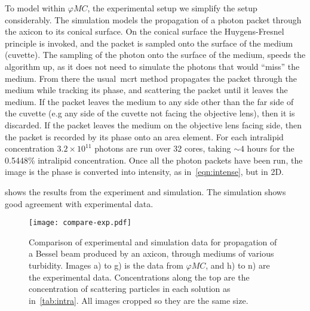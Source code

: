 To model within $\varphi MC$, the experimental setup we simplify the setup considerably.
The simulation models the propagation of a photon packet through the axicon to its conical surface. 
On the conical surface the Huygens-Fresnel principle is invoked, and the packet is sampled onto the surface of the medium (cuvette).
The sampling of the photon onto the surface of the medium, speeds the algorithm up, as it does not need to simulate the photons that would ``miss'' the medium.
From there the usual~\gls{mcrt} method propagates the packet through the medium while tracking its phase, and scattering the packet until it leaves the medium.
If the packet leaves the medium to any side other than the far side of the cuvette (e.g any side of the cuvette not facing the objective lens), then it is discarded.
If the packet leaves the medium on the objective lens facing side, then the packet is recorded by its phase onto an area element.
For each intralipid concentration $3.2\times10^11$ photons are run over 32 cores, taking $\sim 4$ hours for the 0.5448\% intralipid concentration.
Once all the photon packets have been run, the image is the phase is converted into intensity, as in~\cref{eqn:intense}, but in 2D.

 shows the results from the experiment and simulation. The simulation shows good agreement with experimental data.

\begin{figure}[!ht]
\centering
\texttt{[image: compare-exp.pdf]}
\caption{Comparison of experimental and simulation data for propagation of a Bessel beam produced by an axicon, through mediums of various turbidity. Images a) to g) is the data from $\varphi MC$, and h) to n) are the experimental data. Concentrations along the top are the concentration of scattering particles in each solution as in~\cref{tab:intra}. All images cropped so they are the same size.}
\label{fig:compareexpbessel}
\end{figure}



\FloatBarrier

